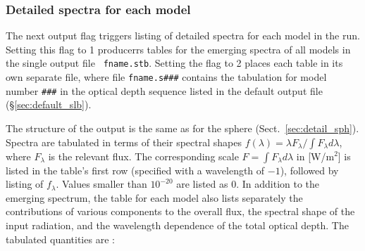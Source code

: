 \documentclass[11pt]{article}
\def\E#1{\hbox{$10^{#1}$}}
\begin{document}
\subsubsection{Detailed spectra for each model }
\label{sec:detail_slb}

The next output flag triggers listing of detailed spectra for each
model in the run.  Setting this flag to 1 producerrs tables for the
emerging spectra of all models in the single output file {\tt
  fname.stb}.  Setting the flag to 2 places each table in its own
separate file, where file {\tt fname.s\#\#\#} contains the tabulation
for model number {\tt \#\#\#} in the optical depth sequence listed in
the default output file (\S\ref{sec:default_slb}).

The structure of the output is the same as for the sphere
(Sect.~\ref{sec:detail_sph}). Spectra are tabulated in terms of their
spectral shapes $f(\lambda) = \lambda F_\lambda/\int\!F_\lambda
d\lambda$, where $F_\lambda$ is the relevant flux. The corresponding
scale $F = \int\!F_\lambda d\lambda$ in [W/m$^2$] is listed in the
table's first row (specified with a wavelength of $-1$), followed by
listing of $f_\lambda$.  Values smaller than \E{-20} are listed as
0. In addition to the emerging spectrum, the table for each model also
lists separately the contributions of various components to the
overall flux, the spectral shape of the input radiation, and the
wavelength dependence of the total optical depth.  The tabulated
quantities are :
%
%
%
\end{document}
